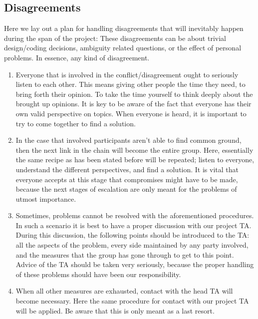 \subsection{Disagreements}
Here we lay out a plan for handling disagreements that will inevitably happen during the span of the project: These disagreements can be about trivial design/coding decisions, ambiguity related questions, or the effect of personal problems. In essence, any kind of disagreement.
\begin{enumerate}
    \item Everyone that is involved in the conflict/disagreement ought to seriously listen to each other. This means giving other people the time they need, to bring forth their opinion. To take the time yourself to think deeply about the brought up opinions. It is key to be aware of the fact that everyone has their own valid perspective on topics. When everyone is heard, it is important to try to come together to find a solution.
    \item In the case that involved participants aren’t able to find common ground, then the next link in the chain will become the entire group. Here, essentially the same recipe as has been stated before will be repeated; listen to everyone, understand the different perspectives, and find a solution. It is vital that everyone accepts at this stage that compromises might have to be made, because the next stages of escalation are only meant for the problems of utmost importance.
    \item Sometimes, problems cannot be resolved with the aforementioned procedures. In such a scenario it is best to have a proper discussion with our project TA. During this discussion, the following points should be introduced to the TA: all the aspects of the problem, every side maintained by any party involved, and the measures that the group has gone through to get to this point. Advice of the TA should be taken very seriously, because the proper handling of these problems should have been our responsibility.
    \item When all other measures are exhausted, contact with the head TA will become necessary. Here the same procedure for contact with our project TA will be applied. Be aware that this is only meant as a last resort.
\end{enumerate}
